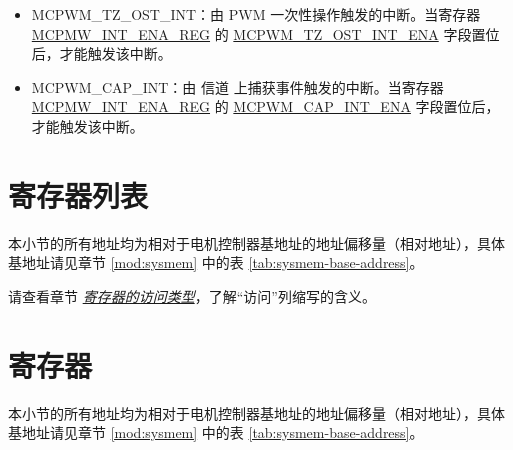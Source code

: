 \documentclass[main\_\_CN.tex]{subfiles}
\begin{document}
\begin{itemize}
\item \label{int:mcpwm-tz-ost}MCPWM\_TZ\_OST\_INT：由 PWM 一次性操作触发的中断。当寄存器 \hyperref[regdesc:MCPWMINTENAREG]{MCPMW\_INT\_ENA\_REG} 的 \hyperref[fielddesc:MCPWMTZ0OSTINTENA]{MCPWM\_TZ\_OST\_INT\_ENA} 字段置位后，才能触发该中断。
\item \label{int:mcpwm-cap}MCPWM\_CAP\_INT：由 信道 上捕获事件触发的中断。当寄存器 \hyperref[regdesc:MCPWMINTENAREG]{MCPMW\_INT\_ENA\_REG} 的 \hyperref[fielddesc:MCPWMCAP0INTENA]{MCPWM\_CAP\_INT\_ENA} 字段置位后，才能触发该中断。
\end{itemize}



\clearpage
\hypertarget{mcpwm-reg-summ}{}
\section{寄存器列表}
\label{sec:mcpwm-reg-summ}

本小节的所有地址均为相对于电机控制器基地址的地址偏移量（相对地址），具体基地址请见章节 \ref{mod:sysmem} \textit{} 中的表 \ref{tab:sysmem-base-address}。

请查看章节 \hyperref[glossary-access-types]{\textit{寄存器的访问类型}}，了解“访问”列缩写的含义。






\clearpage
\section{寄存器}

本小节的所有地址均为相对于电机控制器基地址的地址偏移量（相对地址），具体基地址请见章节 \ref{mod:sysmem} \textit{} 中的表 \ref{tab:sysmem-base-address}。


\end{document}
